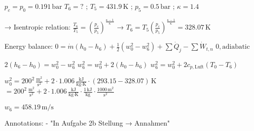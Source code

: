 \( p_c = p_0 = 0.191 \, \text{bar} \)  
\( T_6 = ? \) ; \( T_5 = 431.9 \, \text{K} \) ; \( p_5 = 0.5 \, \text{bar} \) ; \( \kappa = 1.4 \)  

→ Isentropic relation:  
\( \frac{T_6}{T_5} = \left( \frac{p_c}{p_5} \right)^{\frac{\kappa - 1}{\kappa}} \) → \( T_6 = T_5 \left( \frac{p_c}{p_5} \right)^{\frac{\kappa - 1}{\kappa}} = 328.07 \, \text{K} \)  

Energy balance:  
\( 0 = \dot{m} (h_0 - h_6) + \frac{1}{2} (w_0^2 - w_6^2) + \sum \dot{Q}_j - \sum \dot{W}_{t,n} \)  
\( 0, \text{adiabatic} \)  

\( 2(h_6 - h_0) = w_0^2 - w_6^2 \)  
\( w_6^2 = w_0^2 + 2(h_0 - h_6) \)  
\( w_6^2 = w_0^2 + 2 c_{p,\text{Luft}} (T_0 - T_6) \)  

\( w_0^2 = 200^2 \, \frac{\text{m}^2}{\text{s}^2} + 2 \cdot 1.006 \, \frac{\text{kJ}}{\text{kg·K}} \cdot (293.15 - 328.07) \, \text{K} \)  
\( = 200^2 \, \frac{\text{m}^2}{\text{s}^2} + 2 \cdot 1.006 \, \frac{\text{kJ}}{\text{kg·K}} \cdot \frac{1 \, \text{kJ}}{\text{kg}} \cdot \frac{1000 \, \text{m}^2}{\text{s}^2} \)  

\( w_6 = 458.19 \, \text{m/s} \)  

Annotations:  
- "In Aufgabe 2b Stellung → Annahmen"